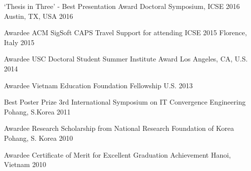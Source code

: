 \vspace{-1mm}



\begin{cvhonors}

  \cvhonor
    {`Thesis in Three' - Best Presentation Award} %
    {Doctoral Symposium, ICSE 2016} %
    {Austin, TX, USA} %
    {2016} %

  \cvhonor
    {Awardee} %
    {ACM SigSoft CAPS Travel Support for attending ICSE 2015} %
    {Florence, Italy} %
    {2015} %

  \cvhonor
    {Awardee} %
    {USC Doctoral Student Summer Institute Award} %
    {Los Angeles, CA, U.S.} %
    {2014} %

  \cvhonor
    {Awardee} %
    {Vietnam Education Foundation Fellowship} %
    {U.S.} %
    {2013} %

  \cvhonor
    {Best Poster Prize} %
    {%
    	3rd International Symposium on IT Convergence Engineering} %
    {Pohang, S.Korea} %
    {2011} %
   
	\cvhonor
	{Awardee} %
	{Research Scholarship from National Research Foundation of Korea} %
	{Pohang, S. Korea} %
	{2010} %

	\cvhonor
	{Awardee} %
	{Certificate of Merit for Excellent Graduation Achievement} %
	{Hanoi, Vietnam} %
	{2010} %

\end{cvhonors}

